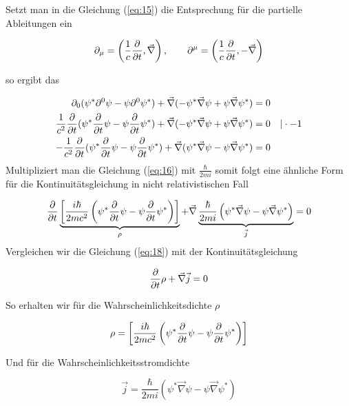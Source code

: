 Setzt man in die Gleichung (\ref{eq:15}) die Entsprechung für die partielle Ableitungen ein

\begin{equation}
  \label{eq:17}
  \partial_\mu = \left(\frac{1}{c}\pdiff_t,\vec \nabla\right), \qquad  \partial^\mu = \left(\frac{1}{c}\pdiff_t,-\vec \nabla\right)
\end{equation}

so ergibt das

\begin{align}
  \label{eq:16}
   \partial_0(  \psi^* \partial^0  \psi  - \psi \partial^0\psi^* ) + \vec \nabla ( - \psi^* \vec \nabla  \psi  + \psi \vec \nabla \psi^* )  &= 0 \notag \\
 \frac{1}{c^2}\pdiff_t (  \psi^* \pdiff_t \psi  - \psi \pdiff_t\psi^* ) + \vec \nabla ( - \psi^* \vec \nabla  \psi  + \psi \vec \nabla \psi^* )  &= 0 \quad |\cdot -1 \notag \\
- \frac{1}{c^2}\pdiff_t (  \psi^* \pdiff_t \psi  - \psi \pdiff_t\psi^* ) + \vec \nabla ( \psi^* \vec \nabla  \psi  - \psi \vec \nabla \psi^* )  &= 0 
\end{align}
Multipliziert man die Gleichung (\ref{eq:16}) mit \(\frac{\hbar}{2mi}\) somit folgt eine ähnliche Form für die Kontinuitätsgleichung in nicht relativistischen Fall

\begin{equation}
  \label{eq:18}
  \pdiff_t \underbr{ \left[ \frac{i\hbar}{2mc^2}\left( \psi^* \pdiff_t \psi  -  \psi \pdiff_t\psi^*\right) \right]}_{\rho} + \vec \nabla \underbr{\frac{\hbar}{2mi} \left( \psi^* \vec \nabla  \psi  - \psi \vec \nabla \psi^* \right)}_{\vec j}  = 0 \\
\end{equation}
Vergleichen wir die Gleichung (\ref{eq:18}) mit der Kontinuitätsgleichung 

\begin{equation}
  \label{eq:19}
  \pdiff_t \rho + \vec\nabla\vec j = 0
\end{equation}


So erhalten wir für die Wahrscheinlichkeitsdichte \(\rho\)

\begin{equation}
  \label{eq:20}
  \rho = \left[ \frac{i\hbar}{2mc^2}\left( \psi^* \pdiff_t \psi  -  \psi \pdiff_t\psi^*\right) \right]
\end{equation}

Und für die Wahrscheinlichkeitsstromdichte

\begin{equation}
  \label{eq:21}
  \vec j = \frac{\hbar}{2mi} \left( \psi^* \vec \nabla  \psi  - \psi \vec \nabla \psi^* \right)
\end{equation}


